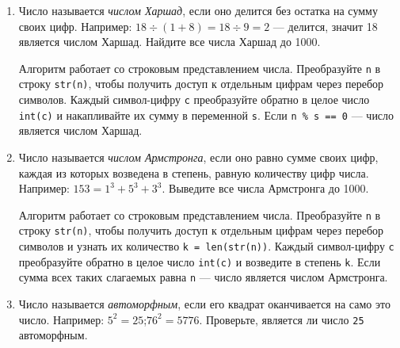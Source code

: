 \documentclass[a4,12pt]{article}
\theoremstyle{remark}
\begin{document}
\begin{enumerate}
    
    
    \item Число называется \emph{числом Харшад}, если оно делится без остатка
на сумму своих цифр. Например: $18 \div (1 + 8) = 18 \div 9 = 2$ ---
делится, значит 18 является числом Харшад.
Найдите все числа Харшад до 1000.

\begin{exercisehint}
    Алгоритм работает со строковым представлением числа.
    Преобразуйте \texttt{n} в строку \texttt{str(n)}, чтобы получить
    доступ к отдельным цифрам через перебор символов.
    Каждый символ-цифру \texttt{c} преобразуйте обратно в целое число
    \texttt{int(c)} и накапливайте их сумму в переменной \texttt{s}.
    Если \texttt{n \% s == 0} --- число является числом Харшад.
\end{exercisehint}


    \item Число называется \emph{числом Армстронга}, если оно равно сумме
своих цифр, каждая из которых возведена в степень, равную количеству
цифр числа. Например: $153 = 1^3 + 5^3 + 3^3$.
Выведите все числа Армстронга до 1000.

\begin{exercisehint}
    Алгоритм работает со строковым представлением числа.
    Преобразуйте \texttt{n} в строку \texttt{str(n)},
    чтобы получить доступ к отдельным цифрам через перебор символов
    и узнать их количество \texttt{k = len(str(n))}.
    Каждый символ-цифру \texttt{c} преобразуйте обратно в целое число
    \texttt{int(c)} и возведите в степень \texttt{k}.
    Если сумма всех таких слагаемых равна \texttt{n} ---
    число является числом Армстронга.
\end{exercisehint}

\item Число называется \emph{автоморфным}, если его квадрат
оканчивается на само это число.
Например: $5^2 = 25$;\quad $76^2 = 5776$.
Проверьте, является ли число \texttt{25} автоморфным.


\end{enumerate}
\end{document}
